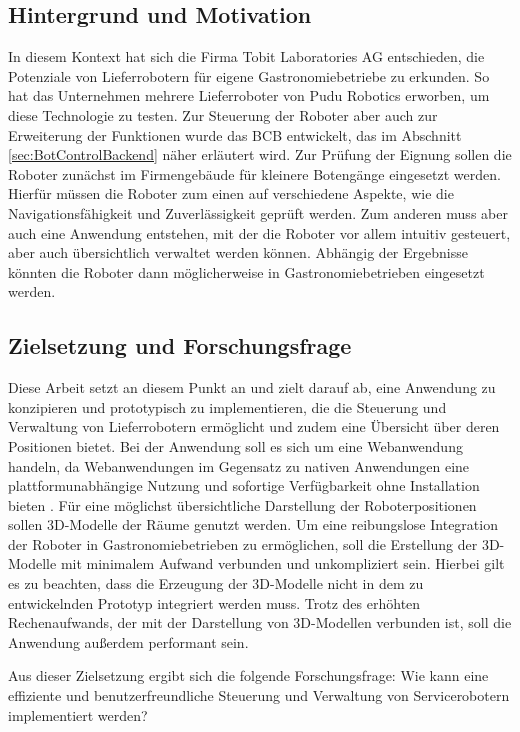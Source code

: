 \subsection{Hintergrund und Motivation}\label{sec:BackgroundAndMotivation}
In diesem Kontext hat sich die Firma Tobit Laboratories AG entschieden, die Potenziale von Lieferrobotern für eigene Gastronomiebetriebe zu erkunden. So hat das Unternehmen mehrere Lieferroboter von Pudu Robotics erworben, um diese Technologie zu testen. Zur Steuerung der Roboter aber auch zur Erweiterung der Funktionen wurde das \ac{BCB} entwickelt, das im Abschnitt \ref{sec:BotControlBackend} näher erläutert wird. Zur Prüfung der Eignung sollen die Roboter zunächst im Firmengebäude für kleinere Botengänge eingesetzt werden. Hierfür müssen die Roboter zum einen auf verschiedene Aspekte, wie die Navigationsfähigkeit und Zuverlässigkeit geprüft werden. Zum anderen muss aber auch eine Anwendung entstehen, mit der die Roboter vor allem intuitiv gesteuert, aber auch übersichtlich verwaltet werden können. Abhängig der Ergebnisse könnten die Roboter dann möglicherweise in Gastronomiebetrieben eingesetzt werden.

\subsection{Zielsetzung und Forschungsfrage}\label{sec:ResearchQuestion}
Diese Arbeit setzt an diesem Punkt an und zielt darauf ab, eine Anwendung zu konzipieren und prototypisch zu implementieren, die die Steuerung und Verwaltung von Lieferrobotern ermöglicht und zudem eine Übersicht über deren Positionen bietet. Bei der Anwendung soll es sich um eine Webanwendung handeln, da Webanwendungen im Gegensatz zu nativen Anwendungen eine plattformunabhängige Nutzung und sofortige Verfügbarkeit ohne Installation bieten \cite{AWSWebApp}. Für eine möglichst übersichtliche Darstellung der Roboterpositionen sollen 3D-Modelle der Räume genutzt werden. Um eine reibungslose Integration der Roboter in Gastronomiebetrieben zu ermöglichen, soll die Erstellung der 3D-Modelle mit minimalem Aufwand verbunden und unkompliziert sein. Hierbei gilt es zu beachten, dass die Erzeugung der 3D-Modelle nicht in dem zu entwickelnden Prototyp integriert werden muss. Trotz des erhöhten Rechenaufwands, der mit der Darstellung von 3D-Modellen verbunden ist, soll die Anwendung außerdem performant sein.

Aus dieser Zielsetzung ergibt sich die folgende Forschungsfrage: Wie kann eine effiziente und benutzerfreundliche Steuerung und Verwaltung von Servicerobotern implementiert werden?

